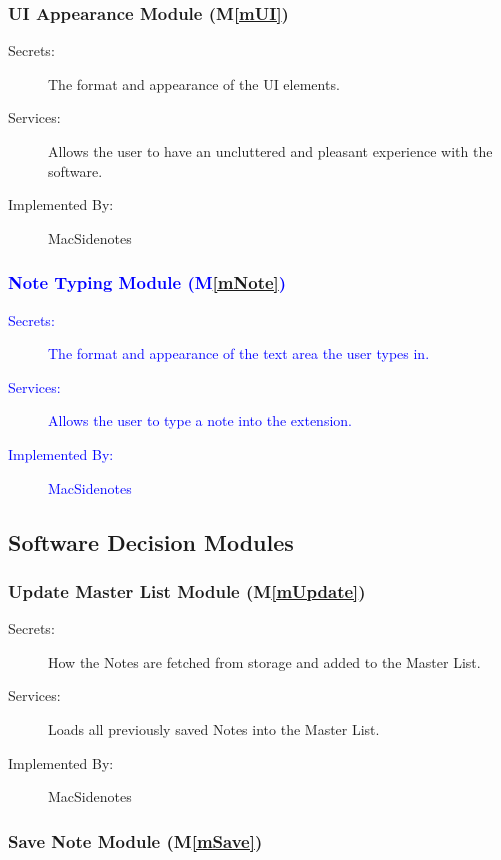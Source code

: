 \documentclass[12pt, titlepage]{article}
\newcommand{\mref}[1]{M\ref{#1}}
\begin{document}
\subsubsection{UI Appearance Module (\mref{mUI})}

\begin{description}
	\item[Secrets:]The format and appearance of the UI elements.
	\item[Services:]Allows the user to have an uncluttered and pleasant 
	experience with the software.
	\item[Implemented By:] MacSidenotes
\end{description}

\textcolor{blue}{\subsubsection{Note Typing Module (\mref{mNote})}
\begin{description}
	\item[Secrets:]The format and appearance of the text area the user types in. 
	\item[Services:]Allows the user to type a note into the extension.
	\item[Implemented By:] MacSidenotes
\end{description}
}

\subsection{Software Decision Modules}

\subsubsection{Update Master List Module (\mref{mUpdate})}

\begin{description}
	\item[Secrets:]How the Notes are fetched from storage and added to the 
	Master List.
	\item[Services:]Loads all previously saved Notes into the Master List.
	\item[Implemented By:] MacSidenotes
\end{description}

\subsubsection{Save Note Module (\mref{mSave})}
\end{document}

